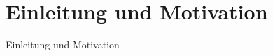 \chapter{Einleitung und Motivation}
\label{ch:00-introduction-and-motivation}

Einleitung und Motivation
